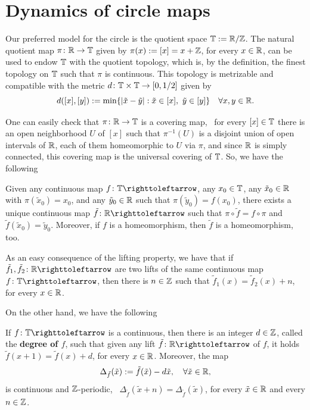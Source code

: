 \section{Dynamics of circle maps}
\label{sec:dynamics-circle-maps}

Our preferred model for the circle is the quotient space $\mathbb{T}:=\mathbb{R}/\mathbb{Z}$. The natural quotient map $\pi\colon\mathbb{R}\to\mathbb{T}$ given by $\pi(x):=[x]=x+\mathbb{Z}$, for every $x\in\mathbb{R}$, can be used to endow $\mathbb{T}$ with the quotient topology, which is, by the definition, the finest topology on $\mathbb{T}$ such that $\pi$ is continuous. This topology is metrizable and compatible with the metric $d\colon\mathbb{T}\times\mathbb{T}\to[0,1/2]$ given by
\begin{equation}
  \label{eq:distance-circle}
  d([x],[y]):=\min\{\left\lvert{\tilde{x}-\tilde{y}}\right\rvert : \tilde x\in[x],\ \tilde y\in[y]\}\quad\forall x,y\in\mathbb{R}.
\end{equation}

One can easily check that $\pi\colon\mathbb{R}\to\mathbb{T}$ is a covering map, \ie~for every $[x]\in\mathbb{T}$ there is an open neighborhood $U$ of $[x]$ such that $\pi^{-1}(U)$ is a disjoint union of open intervals of $\mathbb{R}$, each of them homeomorphic to $U$ via $\pi$, and since $\mathbb{R}$ is simply connected, this covering map is the universal covering of $\mathbb{T}$. So, we have the following

\begin{proposition}
  \label{prop:lifting-property-circle}
  Given any continuous map $f\colon\T\carr$, any $x_0\in\mathbb{T}$, any $\tilde x_0\in\mathbb{R}$ with $\pi(\tilde x_0)=x_0$, and any $\tilde y_0\in\mathbb{R}$ such that $\pi(\tilde y_0)=f(x_0)$, there exists a unique continuous map $\tilde f\colon\R\carr$ such that $\pi\circ \tilde f=f\circ\pi$ and $\tilde f(\tilde x_0)=\tilde y_0$. Moreover, if $f$ is a homeomorphism, then $\tilde f$ is a homeomorphism, too.
\end{proposition}

As an easy consequence of the lifting property, we have that if $\tilde f_1,\tilde f_2\colon\R\carr$ are two lifts of the same continuous map $f\colon\T\carr$, then there is $n\in\mathbb{Z}$ such that $\tilde f_1(x)=\tilde f_2(x)+n$, for every $x\in\mathbb{R}$.

On the other hand, we have the following

\begin{proposition}
  \label{prop:degree-circle-maps}
  If $f\colon\T\carr$ is a continuous, then there is an integer $d\in\mathbb{Z}$, called the \textbf{degree of $f$}, such that given any lift $\tilde f\colon\R\carr$ of $f$, it holds $\tilde f(x+1)=\tilde f(x)+d$, for every $x\in\mathbb{R}$. Moreover, the map
  \begin{displaymath}
    \Delta_{\tilde f}(\tilde x):=\tilde f(\tilde x)-d\tilde x, \quad\forall \tilde x\in\mathbb{R},
  \end{displaymath}
  is continuous and $\mathbb{Z}$-periodic, \ie~$\Delta_{\tilde f}(\tilde x+n)=\Delta_{\tilde f}(\tilde x)$, for every $\tilde x\in\mathbb{R}$ and every $n\in\mathbb{Z}$.
\end{proposition}

